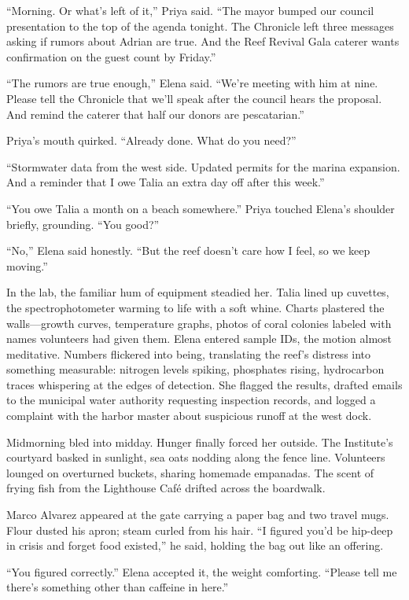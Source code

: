 “Morning. Or what’s left of it,” Priya said. “The mayor bumped our council presentation to the top of the agenda tonight. The Chronicle left three messages asking if rumors about Adrian are true. And the Reef Revival Gala caterer wants confirmation on the guest count by Friday.”

“The rumors are true enough,” Elena said. “We’re meeting with him at nine. Please tell the Chronicle that we’ll speak after the council hears the proposal. And remind the caterer that half our donors are pescatarian.”

Priya’s mouth quirked. “Already done. What do you need?”

“Stormwater data from the west side. Updated permits for the marina expansion. And a reminder that I owe Talia an extra day off after this week.”

“You owe Talia a month on a beach somewhere.” Priya touched Elena’s shoulder briefly, grounding. “You good?”

“No,” Elena said honestly. “But the reef doesn’t care how I feel, so we keep moving.”

In the lab, the familiar hum of equipment steadied her. Talia lined up cuvettes, the spectrophotometer warming to life with a soft whine. Charts plastered the walls—growth curves, temperature graphs, photos of coral colonies labeled with names volunteers had given them. Elena entered sample IDs, the motion almost meditative. Numbers flickered into being, translating the reef’s distress into something measurable: nitrogen levels spiking, phosphates rising, hydrocarbon traces whispering at the edges of detection. She flagged the results, drafted emails to the municipal water authority requesting inspection records, and logged a complaint with the harbor master about suspicious runoff at the west dock.

Midmorning bled into midday. Hunger finally forced her outside. The Institute’s courtyard basked in sunlight, sea oats nodding along the fence line. Volunteers lounged on overturned buckets, sharing homemade empanadas. The scent of frying fish from the Lighthouse Café drifted across the boardwalk.

Marco Alvarez appeared at the gate carrying a paper bag and two travel mugs. Flour dusted his apron; steam curled from his hair. “I figured you’d be hip-deep in crisis and forget food existed,” he said, holding the bag out like an offering.

“You figured correctly.” Elena accepted it, the weight comforting. “Please tell me there’s something other than caffeine in here.”

